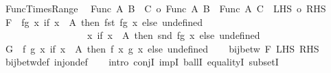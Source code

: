 \begin{isabellebody}
\isamarkupfalse%
%
\endisatagproof
{\isafoldproof}%
%
\isadelimproof
\isanewline
%
\endisadelimproof
\isanewline
{}\isamarkupfalse%
\ Func{\isacharunderscore}{\kern0pt}Times{\isacharunderscore}{\kern0pt}Range{\isacharcolon}{\kern0pt}\isanewline
\ \ {\isachardoublequoteopen}{\isacharbar}{\kern0pt}Func\ A\ {\isacharparenleft}{\kern0pt}B\ {\isasymtimes}\ C{\isacharparenright}{\kern0pt}{\isacharbar}{\kern0pt}\ {\isacharequal}{\kern0pt}o\ {\isacharbar}{\kern0pt}Func\ A\ B\ {\isasymtimes}\ Func\ A\ C{\isacharbar}{\kern0pt}{\isachardoublequoteclose}\ {\isacharparenleft}{\kern0pt}\ {\isachardoublequoteopen}{\isacharbar}{\kern0pt}{\isacharquery}{\kern0pt}LHS{\isacharbar}{\kern0pt}\ {\isacharequal}{\kern0pt}o\ {\isacharbar}{\kern0pt}{\isacharquery}{\kern0pt}RHS{\isacharbar}{\kern0pt}{\isachardoublequoteclose}{\isacharparenright}{\kern0pt}\isanewline
%
\isadelimproof
%
\endisadelimproof
%
\isatagproof
{}\isamarkupfalse%
\ {\isacharminus}{\kern0pt}\isanewline
\ \ \isamarkupfalse%
\ {\isacharquery}{\kern0pt}F\ {\isacharequal}{\kern0pt}\ {\isachardoublequoteopen}{\isasymlambda}fg{\isachardot}{\kern0pt}\ {\isacharparenleft}{\kern0pt}{\isasymlambda}x{\isachardot}{\kern0pt}\ if\ x\ {\isasymin}\ A\ then\ fst\ {\isacharparenleft}{\kern0pt}fg\ x{\isacharparenright}{\kern0pt}\ else\ undefined{\isacharcomma}{\kern0pt}\isanewline
\ \ \ \ \ \ \ \ \ \ \ \ \ \ \ \ \ \ {\isasymlambda}x{\isachardot}{\kern0pt}\ if\ x\ {\isasymin}\ A\ then\ snd\ {\isacharparenleft}{\kern0pt}fg\ x{\isacharparenright}{\kern0pt}\ else\ undefined{\isacharparenright}{\kern0pt}{\isachardoublequoteclose}\isanewline
\ \ \isamarkupfalse%
\ {\isacharquery}{\kern0pt}G\ {\isacharequal}{\kern0pt}\ {\isachardoublequoteopen}{\isasymlambda}{\isacharparenleft}{\kern0pt}f{\isacharcomma}{\kern0pt}\ g{\isacharparenright}{\kern0pt}\ x{\isachardot}{\kern0pt}\ if\ x\ {\isasymin}\ A\ then\ {\isacharparenleft}{\kern0pt}f\ x{\isacharcomma}{\kern0pt}\ g\ x{\isacharparenright}{\kern0pt}\ else\ undefined{\isachardoublequoteclose}\isanewline
\ \ \isamarkupfalse%
\ {\isachardoublequoteopen}bij{\isacharunderscore}{\kern0pt}betw\ {\isacharquery}{\kern0pt}F\ {\isacharquery}{\kern0pt}LHS\ {\isacharquery}{\kern0pt}RHS{\isachardoublequoteclose}\ \isamarkupfalse%
\ bij{\isacharunderscore}{\kern0pt}betw{\isacharunderscore}{\kern0pt}def\ inj{\isacharunderscore}{\kern0pt}on{\isacharunderscore}{\kern0pt}def\isanewline
\ \ \isamarkupfalse%
\ {\isacharparenleft}{\kern0pt}intro\ conjI\ impI\ ballI\ equalityI\ subsetI{\isacharparenright}{\kern0pt}\isanewline

\end{isabellebody}
